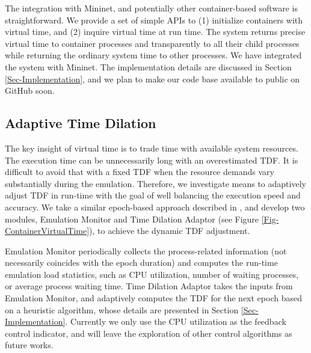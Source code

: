 The integration with Mininet, and potentially other container-based software is straightforward. We provide a set of simple APIs to (1) initialize containers with virtual time, and (2) inquire virtual time at run time. The system returns precise virtual time to container processes and transparently to all their child processes while returning the ordinary system time to other processes. We have integrated the system with Mininet. The implementation details are discussed in Section \ref{Sec-Implementation}, and we plan to make our code base available to public on GitHub soon. 

\subsection{Adaptive Time Dilation}

The key insight of virtual time is to trade time with available system resources. The execution time can be unnecessarily long with an overestimated TDF. It is difficult to avoid that with a fixed TDF when the resource demands vary substantially during the emulation. Therefore, we investigate means to adaptively adjust TDF in run-time with the goal of well balancing the execution speed and accuracy. We take a similar epoch-based approach described in \cite{NtwkEmultAdaptVirtTime}, and develop two modules, Emulation Monitor and Time Dilation Adaptor (see Figure \ref{Fig-ContainerVirtualTime}), to achieve the dynamic TDF adjustment. 

Emulation Monitor periodically collects the process-related information (not necessarily coincides with the epoch duration) and computes the run-time emulation load statistics, such as CPU utilization, number of waiting processes, or average process waiting time. Time Dilation Adaptor takes the inputs from Emulation Monitor, and adaptively computes the TDF for the next epoch based on a heuristic algorithm, whose details are presented in Section \ref{Sec-Implementation}. Currently we only use the CPU utilization as the feedback control indicator, and will leave the exploration of other control algorithms as future works. 


